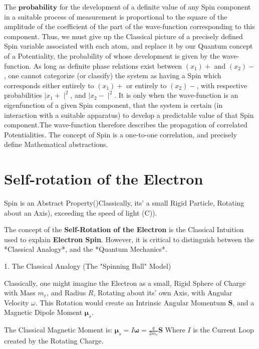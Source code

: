 \documentclass[a4paper, 10pt, onepage]{elegantbook}
\begin{document}
{The $\mathbf{\textbf{probability}}$ for the development of a definite value of any Spin component in a suitable process 
of measurement is proportional to the square of the amplitude of the coefficient of the part of the wave-function 
corresponding to this component.
Thus, we must give up the Classical picture of a precisely defined Spin variable associated with each atom, and replace 
it by our Quantum concept of a Potentiality, the probability of whose development is given by the wave-function.
As long as definite phase relations exist between $(x_1)+$ and $(x_2)-$, one cannot categorize (or classify) the system 
as having a Spin which corresponds either entirely to $(x_1)+$ or entirely to $(x_2)-$, with respective probabilities 
$\mid {x_1+} \mid^2$, and $\mid {x_2-} \mid^2$.
It is only when the wave-function is an eigenfunction of a given Spin component, that the system is certain (in 
interaction with a suitable apparatus) to develop a predictable value of that Spin component.The wave-function 
therefore describes the propagation of correlated Potentialities.
The concept of Spin is a one-to-one correlation, and precisely define Mathematical abstractions.

\section{Self-rotation of the Electron}

Spin is an Abstract Property()Classically, its' a small Rigid Particle, Rotating about an Axis), exceeding the speed of 
light (C)).  

The concept of the \textbf{Self-Rotation of the Electron} is the Classical Intuition used to explain \textbf{Electron 
Spin}. However, it is critical to distinguish between the *Classical Analogy*, and the *Quantum Mechanics*.  

    1. The Classical Analogy (The "Spinning Ball" Model)  

\noindent

Classically, one might imagine the Electron as a small, Rigid Sphere of Charge with Mass $m_e$, and Radius $R$, 
Rotating about its' own Axis, with Angular Velocity $\omega$. This Rotation would create an Intrinsic Angular Momentum 
$\mathbf{S}$, and a Magnetic Dipole Moment $\boldsymbol{\mu}_s$.  

The Classical Magnetic Moment is:  
$ \boldsymbol{\mu}_s = I \boldsymbol{\omega} = \frac{q}{2m_e} \mathbf{S} $  
Where $I$ is the Current Loop created by the Rotating Charge.  

}
\end{document}
